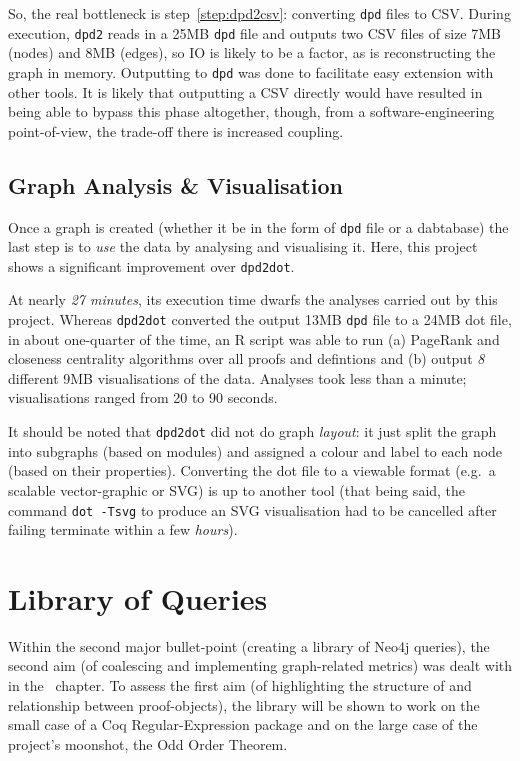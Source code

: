 So, the real bottleneck is step~\ref{step:dpd2csv}: converting \texttt{dpd}
files to CSV. During execution, \texttt{dpd2} reads in a 25MB \texttt{dpd} file
and outputs two CSV files of size 7MB (nodes) and 8MB (edges), so IO is likely
to be a factor, as is reconstructing the graph in memory. Outputting to
\texttt{dpd} was done to facilitate easy extension with other tools. It is
likely that outputting a CSV directly would have resulted in being able to
bypass this phase altogether, though, from a software-engineering
point-of-view, the trade-off there is increased coupling.

\subsection{Graph Analysis \& Visualisation}

Once a graph is created (whether it be in the form of \texttt{dpd} file or a
dabtabase) the last step is to \emph{use} the data by analysing and visualising
it. Here, this project shows a significant improvement over \texttt{dpd2dot}.

At nearly \emph{27 minutes}, its execution time dwarfs the analyses carried out
by this project. Whereas \texttt{dpd2dot} converted the output 13MB \texttt{dpd}
file to a 24MB dot file, in about one-quarter of the time, an R script was able
to run (a) PageRank and closeness centrality algorithms over all proofs and
defintions and (b) output \emph{8} different 9MB visualisations of the data.
Analyses took less than a minute; visualisations ranged from 20 to 90 seconds.

It should be noted that \texttt{dpd2dot} did not do graph \emph{layout}: it just
split the graph into subgraphs (based on modules) and assigned a colour and label
to each node (based on their properties). Converting the dot file to a viewable
format (e.g.\ a scalable vector-graphic or SVG) is up to another tool (that
being said, the command \texttt{dot -Tsvg} to produce an SVG visualisation had to
be cancelled after failing terminate within a few \emph{hours}).

\section{Library of Queries}\label{sec:libeval}

Within the second major bullet-point (creating a library of Neo4j queries), the
second aim (of coalescing and implementing graph-related metrics) was dealt
with in the~ chapter. To assess the first aim (of
highlighting the structure of and relationship between proof-objects), the
library will be shown to work on the small case of a Coq Regular-Expression
package and on the large case of the project's moonshot, the
Odd Order Theorem.


